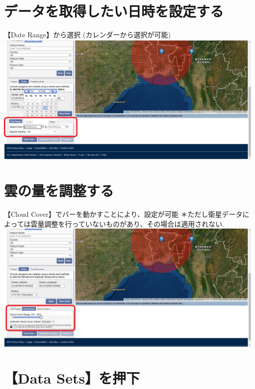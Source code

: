 \documentclass[
]{book}
\begin{document}
\hypertarget{ux30c7ux30fcux30bfux3092ux53d6ux5f97ux3057ux305fux3044ux65e5ux6642ux3092ux8a2dux5b9aux3059ux308b}{%
\section{データを取得したい日時を設定する}\label{ux30c7ux30fcux30bfux3092ux53d6ux5f97ux3057ux305fux3044ux65e5ux6642ux3092ux8a2dux5b9aux3059ux308b}}

【Date Range】から選択
(カレンダーから選択が可能)
\includegraphics{images/date.png}

\hypertarget{ux96f2ux306eux91cfux3092ux8abfux6574ux3059ux308b}{%
\section{雲の量を調整する}\label{ux96f2ux306eux91cfux3092ux8abfux6574ux3059ux308b}}

【Cloud Cover】でバーを動かすことにより、設定が可能
＊ただし衛星データによっては雲量調整を行っていないものがあり、その場合は適用されない.\\
\includegraphics{images/cloud.png}

\hypertarget{data-setsux3092ux62bcux4e0b}{%
\section{【Data Sets】を押下}\label{data-setsux3092ux62bcux4e0b}}
\end{document}
